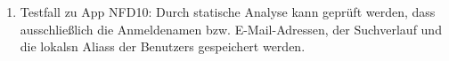 \begin{enumerate}[label=\textbf{/T\arabic*0/}, align=left]
	\item Testfall zu App NFD10: Durch \gls{statische Analyse} kann geprüft werden, dass ausschließlich die Anmeldenamen bzw. E-Mail-Adressen, der \Gls{Suchverlauf} und die \glspl{lokal}n \Glspl{Alias} der \Glspl{Benutzer} gespeichert werden.
\end{enumerate}